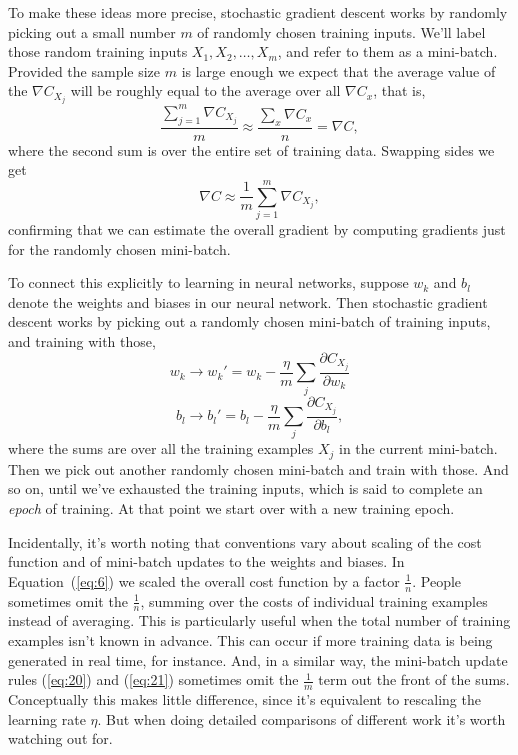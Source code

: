 \documentclass[a4paper,twoside,10pt]{book}
\begin{document}
To make these ideas more precise, stochastic gradient descent works by randomly picking out a small number $m$ of randomly chosen training inputs. We'll label those random training inputs $X_1,X_2,\ldots,X_m$, and refer to them as a mini-batch. Provided the sample size $m$ is large enough we expect that the average value of the $\nabla C_{X_j}$ will be roughly equal to the average over all $\nabla C_x$, that is,
\begin{equation}
	\frac{\sum_{j=1}^m \nabla C_{X_{j}}}{m} \approx \frac{\sum_x \nabla C_x}{n} = \nabla C,
	\tag{18}\label{eq:18}
\end{equation}
where the second sum is over the entire set of training data. Swapping sides we get
\begin{equation}
\nabla C \approx \frac{1}{m} \sum_{j=1}^m \nabla C_{X_{j}},
	\tag{19}\label{eq:19}
\end{equation}
confirming that we can estimate the overall gradient by computing gradients just for the randomly chosen mini-batch.

To connect this explicitly to learning in neural networks, suppose $w_k$ and $b_l$ denote the weights and biases in our neural network. Then stochastic gradient descent works by picking out a randomly chosen mini-batch of training inputs, and training with those,
\begin{equation} 
w_k  \rightarrow w_k' = w_k-\frac{\eta}{m} \sum_j \frac{\partial C_{X_j}}{\partial w_k}\tag{20}\label{eq:20}
\end{equation}
\begin{equation}
b_l  \rightarrow b_l' = b_l-\frac{\eta}{m} \sum_j \frac{\partial C_{X_j}}{\partial b_l}\tag{21}\label{eq:21},
\end{equation}
where the sums are over all the training examples $X_j$ in the current mini-batch. Then we pick out another randomly chosen mini-batch and train with those. And so on, until we've exhausted the training inputs, which is said to complete an \textit{epoch} of training. At that point we start over with a new training epoch.

Incidentally, it's worth noting that conventions vary about scaling of the cost function and of mini-batch updates to the weights and biases. In Equation~(\ref{eq:6}) we scaled the overall cost function by a factor $\frac1n$. People sometimes omit the $\frac1n$, summing over the costs of individual training examples instead of averaging. This is particularly useful when the total number of training examples isn't known in advance. This can occur if more training data is being generated in real time, for instance. And, in a similar way, the mini-batch update rules (\ref{eq:20}) and (\ref{eq:21}) sometimes omit the $\frac1m$ term out the front of the sums. Conceptually this makes little difference, since it's equivalent to rescaling the learning rate $\eta$. But when doing detailed comparisons of different work it's worth watching out for.
\end{document}
